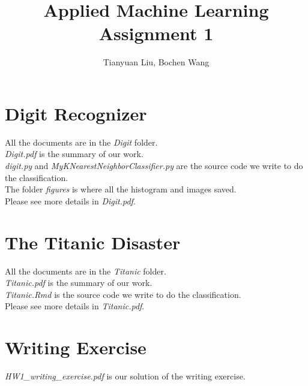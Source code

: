 \documentclass[a4paper]{article}
\begin{document}
\title{Applied Machine Learning \\ Assignment 1}
\author{Tianyuan Liu, Bochen Wang}
\maketitle
\section{Digit Recognizer}
All the documents are in the \emph{Digit} folder. \\
\emph{Digit.pdf} is the summary of our work. \\
\emph{digit.py} and \emph{MyKNearestNeighborClassifier.py} are the source code we write to do the classification.\\
The folder \emph{figures} is where all the histogram and images saved.\\
Please see more details in \emph{Digit.pdf}.   
\section{The Titanic Disaster}
All the documents are in the \emph{Titanic} folder. \\
\emph{Titanic.pdf} is the summary of our work. \\
\emph{Titanic.Rmd} is the source code we write to do the classification.\\
Please see more details in \emph{Titanic.pdf}. 
\section{Writing Exercise}
\emph{HW1\_writing\_exercise.pdf} is our solution of the writing exercise. \\
\end{document}
